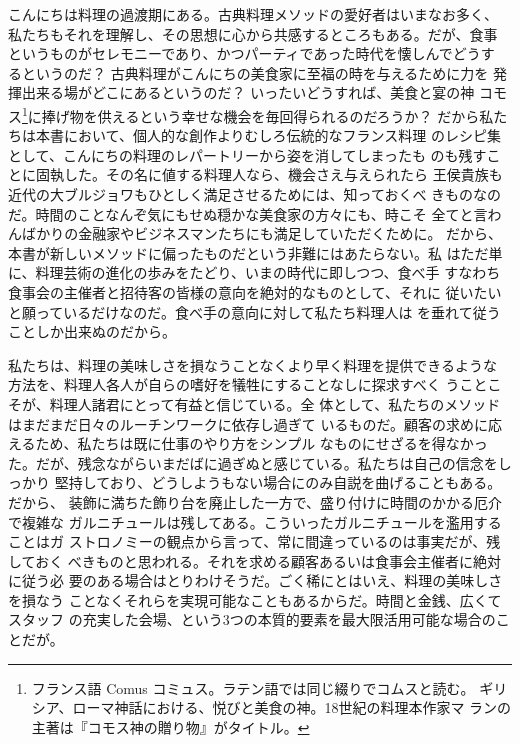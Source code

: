 こんにちは料理の過渡期にある。古典料理メソッドの愛好者はいまなお多く、
私たちもそれを理解し、その思想に心から共感するところもある。だが、食事
というものがセレモニーであり、かつパーティであった時代を懐しんでどうす
るというのだ？ 古典料理がこんにちの美食家に至福の時を与えるために力を
発揮出来る場がどこにあるというのだ？ いったいどうすれば、美食と宴の神
コモス\footnote{フランス語 Comus
  コミュス。ラテン語では同じ綴りでコムスと読む。
  ギリシア、ローマ神話における、悦びと美食の神。18世紀の料理本作家マ
  ランの主著は『コモス神の贈り物』がタイトル。}に捧げ物を供えるという幸せな機会を毎回得られるのだろうか？
だから私たちは本書において、個人的な創作よりむしろ伝統的なフランス料理
のレシピ集として、こんにちの料理のレパートリーから姿を消してしまったも
のも残すことに固執した。その名に値する料理人なら、機会さえ与えられたら
王侯貴族も近代の大ブルジョワもひとしく満足させるためには、知っておくべ
きものなのだ。時間のことなんぞ気にもせぬ穏かな美食家の方々にも、時こそ
全てと言わんばかりの金融家やビジネスマンたちにも満足していただくために。
だから、本書が新しいメソッドに偏ったものだという非難にはあたらない。私
はただ単に、料理芸術の進化の歩みをたどり、いまの時代に即しつつ、食べ手
すなわち食事会の主催者と招待客の皆様の意向を絶対的なものとして、それに
従いたいと願っているだけなのだ。食べ手の意向に対して私たち料理人は
を垂れて従うことしか出来ぬのだから。

私たちは、料理の美味しさを損なうことなくより早く料理を提供できるような
方法を、料理人各人が自らの嗜好を犠牲にすることなしに探求すべく
うことこそが、料理人諸君にとって有益と信じている。全
体として、私たちのメソッドはまだまだ日々のルーチンワークに依存し過ぎて
いるものだ。顧客の求めに応えるため、私たちは既に仕事のやり方をシンプル
なものにせざるを得なかった。だが、残念ながらいまだばに過ぎぬと感じている。私たちは自己の信念をしっかり
堅持しており、どうしようもない場合にのみ自説を曲げることもある。だから、
装飾に満ちた飾り台を廃止した一方で、盛り付けに時間のかかる厄介で複雑な
ガルニチュールは残してある。こういったガルニチュールを濫用することはガ
ストロノミーの観点から言って、常に間違っているのは事実だが、残しておく
べきものと思われる。それを求める顧客あるいは食事会主催者に絶対に従う必
要のある場合はとりわけそうだ。ごく稀にとはいえ、料理の美味しさを損なう
ことなくそれらを実現可能なこともあるからだ。時間と金銭、広くてスタッフ
の充実した会場、という3つの本質的要素を最大限活用可能な場合のことだが。


